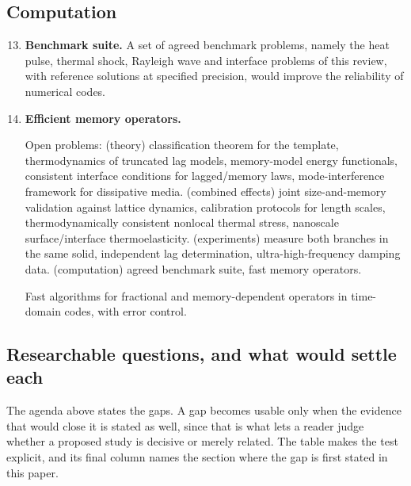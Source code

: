 \subsection{Computation}
\begin{enumerate}
\setcounter{enumi}{12}
\item \textbf{Benchmark suite.} A set of agreed benchmark problems, namely the heat pulse, thermal shock, Rayleigh wave and interface problems of this review, with reference solutions at specified precision, would improve the reliability of numerical codes.
\item \textbf{Efficient memory operators.}

\begin{summarybox}[Summary]
Open problems: (theory) classification theorem for the template, thermodynamics of truncated lag models, memory-model energy functionals, consistent interface conditions for lagged/memory laws, mode-interference framework for dissipative media. (combined effects) joint size-and-memory validation against lattice dynamics, calibration protocols for length scales, thermodynamically consistent nonlocal thermal stress, nanoscale surface/interface thermoelasticity. (experiments) measure both branches in the same solid, independent lag determination, ultra-high-frequency damping data. (computation) agreed benchmark suite, fast memory operators.
\end{summarybox} Fast algorithms for fractional and memory-dependent operators in time-domain codes, with error control.
\end{enumerate}

\subsection{Researchable questions, and what would settle each}\label{sec:research_questions}

The agenda above states the gaps. A gap becomes usable only when the evidence that would close it is
stated as well, since that is what lets a reader judge whether a proposed study is decisive or merely
related. The table makes the test explicit, and its final column names the section where the gap is first
stated in this paper.

